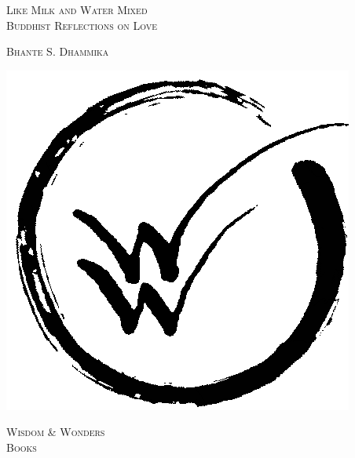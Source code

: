 \documentclass[10pt, openright]{book}
\begin{document}
\begin{center}
\vspace{2em}

\Huge\Titlefont\scshape{Like Milk and Water Mixed}\\
\vspace{0.5em}
\large\Titlefont\scshape{Buddhist Reflections on Love}\\

\begin{Large}
\vspace{4em}
\Titlefont\scshape{Bhante S. Dhammika}
\end{Large}


\vspace*{\fill}
\includegraphics[scale=0.06, trim = 0 13 5 0 ]{../_resources/images/icons/logo-enso-large}\\
\vspace{4pt}
\begin{small}
\scshape{Wisdom \& Wonders\\
Books}
\end{small}
\end{center}
\end{document}
